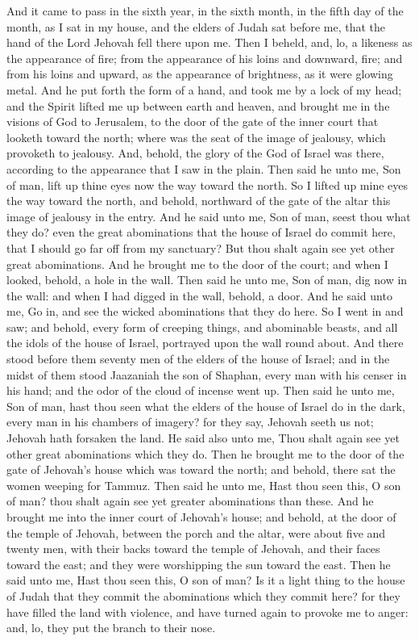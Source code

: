 And it came to pass in the sixth year, in the sixth month, in the fifth day of the month, as I sat in my house, and the elders of Judah sat before me, that the hand of the Lord Jehovah fell there upon me. Then I beheld, and, lo, a likeness as the appearance of fire; from the appearance of his loins and downward, fire; and from his loins and upward, as the appearance of brightness, as it were glowing metal. And he put forth the form of a hand, and took me by a lock of my head; and the Spirit lifted me up between earth and heaven, and brought me in the visions of God to Jerusalem, to the door of the gate of the inner court that looketh toward the north; where was the seat of the image of jealousy, which provoketh to jealousy. And, behold, the glory of the God of Israel was there, according to the appearance that I saw in the plain.  Then said he unto me, Son of man, lift up thine eyes now the way toward the north. So I lifted up mine eyes the way toward the north, and behold, northward of the gate of the altar this image of jealousy in the entry. And he said unto me, Son of man, seest thou what they do? even the great abominations that the house of Israel do commit here, that I should go far off from my sanctuary? But thou shalt again see yet other great abominations.  And he brought me to the door of the court; and when I looked, behold, a hole in the wall. Then said he unto me, Son of man, dig now in the wall: and when I had digged in the wall, behold, a door. And he said unto me, Go in, and see the wicked abominations that they do here. So I went in and saw; and behold, every form of creeping things, and abominable beasts, and all the idols of the house of Israel, portrayed upon the wall round about. And there stood before them seventy men of the elders of the house of Israel; and in the midst of them stood Jaazaniah the son of Shaphan, every man with his censer in his hand; and the odor of the cloud of incense went up. Then said he unto me, Son of man, hast thou seen what the elders of the house of Israel do in the dark, every man in his chambers of imagery? for they say, Jehovah seeth us not; Jehovah hath forsaken the land. He said also unto me, Thou shalt again see yet other great abominations which they do.  Then he brought me to the door of the gate of Jehovah’s house which was toward the north; and behold, there sat the women weeping for Tammuz. Then said he unto me, Hast thou seen this, O son of man? thou shalt again see yet greater abominations than these.  And he brought me into the inner court of Jehovah’s house; and behold, at the door of the temple of Jehovah, between the porch and the altar, were about five and twenty men, with their backs toward the temple of Jehovah, and their faces toward the east; and they were worshipping the sun toward the east. Then he said unto me, Hast thou seen this, O son of man? Is it a light thing to the house of Judah that they commit the abominations which they commit here? for they have filled the land with violence, and have turned again to provoke me to anger: and, lo, they put the branch to their nose. 